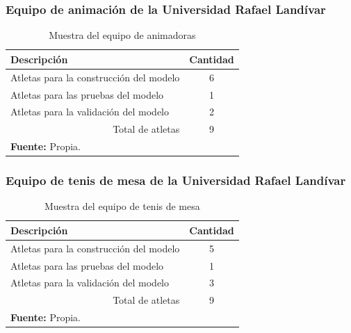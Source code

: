 \subsubsection{Equipo de animaci\'on de la Universidad Rafael Land\'ivar} \label{sj:1t:ani}
\begin{table}[H]
\begin{center}
\caption{Muestra del equipo de animadoras}
\label{tab:MuestraCheerleaders}
\begin{tabular}{lc}
\hline
\multicolumn{1}{|l|}{\textbf{Descripci\'on}} & \multicolumn{1}{l|}{\textbf{Cantidad}} \\ \hline
\multicolumn{1}{|l|}{Atletas para la construcci\'on del modelo} & \multicolumn{1}{c|}{6} \\ \hline
\multicolumn{1}{|l|}{Atletas para las pruebas del modelo} & \multicolumn{1}{c|}{1} \\ \hline
\multicolumn{1}{|l|}{Atletas para la validaci\'on del modelo} & \multicolumn{1}{c|}{2} \\ \hline
\multicolumn{1}{|r|}{Total de atletas} & \multicolumn{1}{c|}{9} \\ \hline
\textbf{Fuente:} Propia.
\end{tabular}
\end{center}
\end{table}
\subsubsection{Equipo de tenis de mesa de la Universidad Rafael Land\'ivar}\label{sj:1t:ten}
\begin{table}[H]
\begin{center}
\caption{Muestra del equipo de tenis de mesa}
\label{tab:MuestraTenis}
\begin{tabular}{lc}
\hline
\multicolumn{1}{|l|}{\textbf{Descripci\'on}} & \multicolumn{1}{l|}{\textbf{Cantidad}} \\ \hline
\multicolumn{1}{|l|}{Atletas para la construcci\'on del modelo} & \multicolumn{1}{c|}{5} \\ \hline
\multicolumn{1}{|l|}{Atletas para las pruebas del modelo} & \multicolumn{1}{c|}{1} \\ \hline
\multicolumn{1}{|l|}{Atletas para la validaci\'on del modelo} & \multicolumn{1}{c|}{3} \\ \hline
\multicolumn{1}{|r|}{Total de atletas} & \multicolumn{1}{c|}{9} \\ \hline
\textbf{Fuente:} Propia.
\end{tabular}
\end{center}
\end{table}
